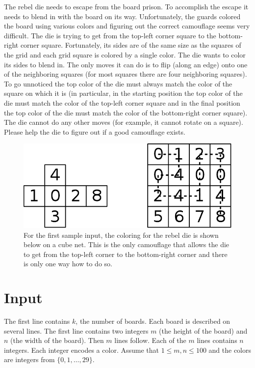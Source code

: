 
The rebel die needs to escape from the board prison. To accomplish the
escape it needs to blend in with the board on its way. Unfortunately,
the guards colored the board using various colors and figuring out the
correct camouflage seems very difficult. The die is trying to get from
the top-left corner square to the bottom-right corner
square. Fortunately, its sides are of the same size as the squares of
the grid and each grid square is colored by a single color. The die
wants to color its sides to blend in. The only moves it can do is to
flip (along an edge) onto one of the neighboring squares (for most
squares there are four neighboring squares). To go unnoticed the top
color of the die must always match the color of the square on which it
is (in particular, in the starting position the top color of the die
must match the color of the top-left corner square and in the final
position the top color of the die must match the color of the
bottom-right corner square). The die cannot do any other moves (for
example, it cannot rotate on a square). Please help the die to figure
out if a good camouflage exists.

\begin{figure}[h]
  \centering
  \includegraphics{rebeldie}
  \caption{For the first sample input, the coloring for the rebel die
    is shown below on a cube net. This is the only camouflage that
    allows the die to get from the top-left corner to the bottom-right
    corner and there is only one way how to do so.}
\label{fig:sample1}
\end{figure}

\section*{Input}

The first line contains $k$, the number of boards. Each board is
described on several lines.  The first line contains two integers $m$
(the height of the board) and $n$ (the width of the board). Then $m$ lines
follow. Each of the $m$ lines contains $n$ integers. Each integer encodes
a color. Assume that $1 \leq m, n \leq 100$ and the colors are integers from
$\{0, 1, \ldots, 29\}$.

